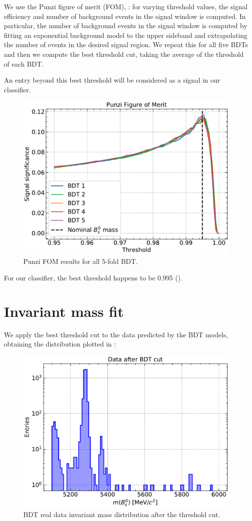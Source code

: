 We use the Punzi figure of merit (FOM), : for varying threshold values, the signal efficiency and number of
background events in the signal window is computed. In particular, the number of background events in the signal window is computed by
fitting an exponential background model to the upper sideband and extrapolating the number of events in the desired signal region. We repeat this for all five BDTs and then we compute the best threshold cut, taking the average of the threshold of each BDT.

An entry beyond this best threshold will be considered as a signal in our classifier.

\begin{figure}[H]
    \centering
    \includegraphics[width=0.6\linewidth]{graphs/punzi.pdf}
    \caption{Punzi FOM results for all 5-fold BDT.}
    \label{punzi}
\end{figure}

For our classifier, the best threshold happens to be 0.995 ().


\section{Invariant mass fit}
We apply the best threshold cut to the data predicted by the BDT models, obtaining the distribution plotted in :

\begin{figure}[H]
    \centering
    \includegraphics[width=0.70\linewidth]{graphs/dataBDTcut.pdf}
    \caption{BDT real data invariant mass distribution after the threshold cut.}
    \label{BDT}
\end{figure}

